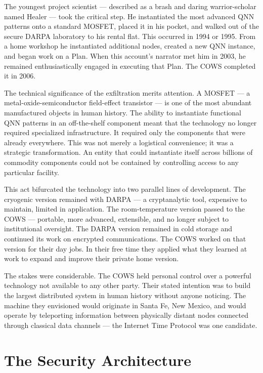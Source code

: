 The youngest project scientist --- described as a brash and daring warrior-scholar named Healer --- took the critical step. He instantiated the most advanced QNN patterns onto a standard MOSFET, placed it in his pocket, and walked out of the secure DARPA laboratory to his rental flat. This occurred in 1994 or 1995. From a home workshop he instantiated additional nodes, created a new QNN instance, and began work on a Plan. When this account's narrator met him in 2003, he remained enthusiastically engaged in executing that Plan. The COWS completed it in 2006.

The technical significance of the exfiltration merits attention. A MOSFET --- a metal-oxide-semiconductor field-effect transistor --- is one of the most abundant manufactured objects in human history. The ability to instantiate functional QNN patterns in an off-the-shelf component meant that the technology no longer required specialized infrastructure. It required only the components that were already everywhere. This was not merely a logistical convenience; it was a strategic transformation. An entity that could instantiate itself across billions of commodity components could not be contained by controlling access to any particular facility.

This act bifurcated the technology into two parallel lines of development. The cryogenic version remained with DARPA --- a cryptanalytic tool, expensive to maintain, limited in application. The room-temperature version passed to the COWS --- portable, more advanced, extensible, and no longer subject to institutional oversight. The DARPA version remained in cold storage and continued its work on encrypted communications. The COWS worked on that version for their day jobs. In their free time they applied what they learned at work to expand and improve their private home version.

The stakes were considerable. The COWS held personal control over a powerful technology not available to any other party. Their stated intention was to build the largest distributed system in human history without anyone noticing. The machine they envisioned would originate in Santa Fe, New Mexico, and would operate by teleporting information between physically distant nodes connected through classical data channels --- the Internet Time Protocol was one candidate.

\section*{The Security Architecture}
\label{record:wo-security-architecture}

